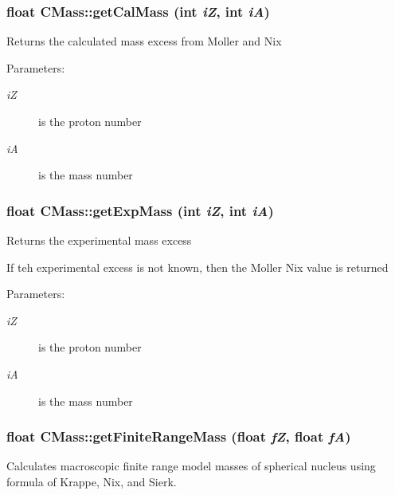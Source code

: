 \subsubsection{\setlength{\rightskip}{0pt plus 5cm}float CMass::get\-Cal\-Mass (int {\em i\-Z}, int {\em i\-A})}\label{classCMass_fd7aa662a139853822a373e3098bf3fa}


Returns the calculated mass excess from Moller and Nix

\begin{Desc}
\item[Parameters:]
\begin{description}
\item[{\em i\-Z}]is the proton number \item[{\em i\-A}]is the mass number \end{description}
\end{Desc}
\subsubsection{\setlength{\rightskip}{0pt plus 5cm}float CMass::get\-Exp\-Mass (int {\em i\-Z}, int {\em i\-A})}\label{classCMass_2431d9c00dc5a3835e14af2c6d61a764}


Returns the experimental mass excess

If teh experimental excess is not known, then the Moller Nix value is returned \begin{Desc}
\item[Parameters:]
\begin{description}
\item[{\em i\-Z}]is the proton number \item[{\em i\-A}]is the mass number \end{description}
\end{Desc}
\subsubsection{\setlength{\rightskip}{0pt plus 5cm}float CMass::get\-Finite\-Range\-Mass (float {\em f\-Z}, float {\em f\-A})}\label{classCMass_ded19b5cce25e6c94596b4e47dad6c84}


Calculates macroscopic finite range model masses of spherical nucleus using formula of Krappe, Nix, and Sierk.

